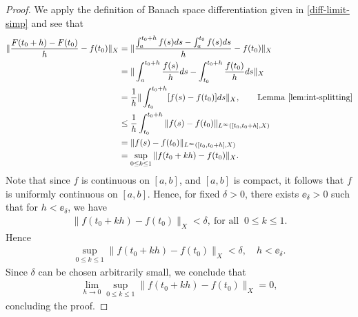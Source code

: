 \begin{proof}
We apply the definition of Banach space
differentiation given in \eqref{diff-limit-simp} and see that
%
%
\begin{equation*}
\begin{split}
   \| \frac{F(t_{0} + h) - F(t_{0})}{h}  - f(t_{0}) \|_{X}
  & = \| \frac{\int_{a}^{t_{0}+h}f(s)ds - \int_{a}^{t_{0}}f(s)ds}{h} -
  f(t_{0}) \|_{X}
  \\
  & = \| \int_{a}^{t_{0}+h}\frac{f(s)}{h}ds  -
  \int_{t_{0}}^{t_{0} + h} \frac{f(t_{0})}{h} ds \|_{X}
  \\
  & = \frac{1}{h} \| \int_{t_{0}}^{t_{0} + h}[f(s) - f(t_{0})]ds \|_{X}, \qquad
  \text{Lemma~\ref{lem:int-splitting}}
  \\
  & \le \frac{1}{h} \int_{t_{0}}^{t_{0} + h} \| f(s) - f(t_{0})
  \|_{L^{\infty}\left( [t_{0}, t_{0} + h], X \right)}
  \\
  & = \| f(s) - f(t_{0})
  \|_{L^{\infty}\left( [t_{0}, t_{0} + h], X \right)}
  \\
  & = \sup_{0 \le k \le 1} \| f(t_{0} + kh) - f(t_{0})
  \|_{X}.
\end{split}
\end{equation*}
%
%
Note that since $f$ is continuous on $[a,b]$, and $[a,b]$ is compact, it follows
that $f$ is uniformly continuous on $[a,b]$. Hence, for fixed $\delta > 0$,
there exists $\ee_{\delta} > 0$ such that for $h < \ee_{\delta}$, we have
%
%
\begin{equation*}
\begin{split}
  \| f(t_{0} + kh) - f(t_{0}) \|_{X} < \delta, \ \text{for all } \  0 \le k \le 1.
\end{split}
\end{equation*}
%
%
Hence
%
%
%
\begin{equation*}
\begin{split}
  \sup_{0 \le k \le 1} \| f(t_{0} + kh) - f(t_{0}) \|_{X} < \delta, \quad h <
  \ee_{\delta}.
\end{split}
\end{equation*}
%
%
Since $\delta$ can be chosen arbitrarily small, we conclude that
%
\begin{equation*}
\begin{split}
  \lim_{h \to 0} \sup_{0 \le k \le 1} \| f(t_{0} + kh) - f(t_{0})
  \|_{X} = 0,
\end{split}
\end{equation*}
%
%
concluding the proof.
\end{proof}
%
%
%
%
%
%
%
%
%
%
%
%
%
%
